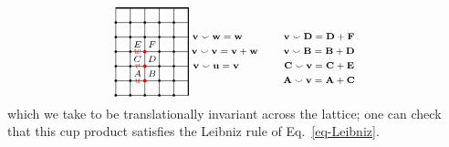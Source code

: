 \documentclass[aps,prx,reprint,superscriptaddress,nofootinbib]{revtex4-2}
\theoremstyle{definition}
\newcommand{\cupp}{\smallsmile}
\newcommand{\<}{\langle}
\renewcommand{\>}{\rangle}
\begin{document}
\begin{equation} \label{eq-cupproductrules}
    \begin{tikzpicture}[scale = 0.4, baseline={([yshift=-.5ex]current bounding box.center)}]
    \foreach \i in {0, ..., 4}{
        \foreach \j in {0, ..., 5}{
            \filldraw[color = black] (\i, \j) circle (2 pt);
        }
    }
    \foreach \i in {0, ..., 4}{
    \foreach \j in {0, ..., 5}{
            \draw[color = black] (\i, \j) -- (\i + 1, \j);
            \draw[color = black] (\i, 6) -- (\i + 1, 6);
            \draw[color = black] (\i, \j) -- (\i, \j + 1);
            \draw[color = black] (5, \j) -- (5, \j + 1);
        }
    }
    \filldraw[color = red] (1 + 1, 1) circle (3 pt);
    \filldraw[color = red] (1 + 1, 2) circle (3 pt);
    \filldraw[color = red] (1 + 1, 3) circle (3 pt);
    \node at (0.5 + 1, 1) {\scriptsize $\textcolor{red}{u}$};
    \node at (0.5 + 1, 2) {\scriptsize $\textcolor{red}{v}$};
    \node at (0.5 + 1, 3) {\scriptsize $\textcolor{red}{w}$};
    \node at (0.5 + 1, 1.5) {\scriptsize $A$};
    \node at (0.5 + 1, 2.5) {\scriptsize$C$};
    \node at (1.5 + 1, 2.5) 
    {\scriptsize$D$};
    \node at (1.5 + 1, 1.5) 
    {\scriptsize$B$};
    \node at (0.5 + 1, 3.5) {\scriptsize$E$};
    \node at (1.5 + 1, 3.5) {\scriptsize$F$};
    \node at (7, 4) {\scriptsize $\mathbf{v} \cupp \mathbf{w} = \mathbf{w}$};
    \node at (7.5, 3) {\scriptsize $\mathbf{v} \cupp \mathbf{v} = \mathbf{v} + \mathbf{w}$};
    \node at (6.9, 2) {\scriptsize $\mathbf{v} \cupp \mathbf{u} = \mathbf{v}$};
    \node at (14, 4) {\scriptsize $\mathbf{v} \cupp \mathbf{D} = \mathbf{D} + \mathbf{F}$};
    \node at (14, 3) {\scriptsize $\mathbf{v} \cupp \mathbf{B} = \mathbf{B} + \mathbf{D}$};
    \node at (14, 2) {\scriptsize $\mathbf{C} \cupp \mathbf{v} = \mathbf{C} + \mathbf{E}$};
    \node at (14, 1) {\scriptsize $\mathbf{A} \cupp \mathbf{v} = \mathbf{A} + \mathbf{C}$};
\end{tikzpicture}
\end{equation}
which we take to be translationally invariant across the lattice; one can check that this cup product satisfies the Leibniz rule of Eq.~\eqref{eq-Leibniz}.
%
\end{document}
